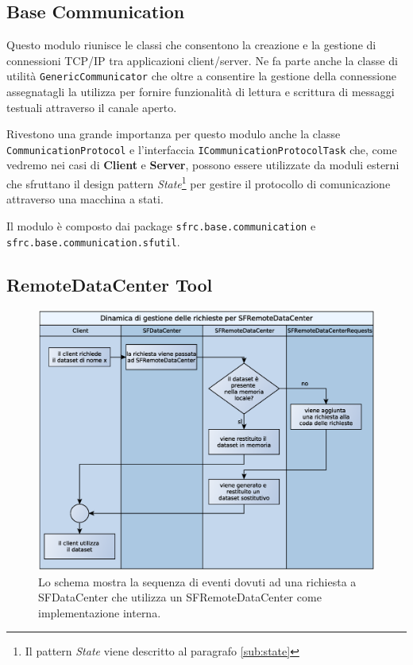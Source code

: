 
\subsection{Base Communication}
\label{sub:basecommodule}
Questo modulo riunisce le classi che consentono la creazione e la gestione di connessioni TCP/IP tra applicazioni client/server. Ne fa parte anche la classe di utilit\`a \texttt{GenericCommunicator} che oltre a consentire la gestione della connessione assegnatagli la utilizza per fornire funzionalit\`a di lettura e scrittura di messaggi testuali attraverso il canale aperto.

Rivestono una grande importanza per questo modulo anche la classe \texttt{CommunicationProtocol} e l'interfaccia \texttt{ICommunicationProtocolTask} che, come vedremo nei casi di \textbf{Client} e \textbf{Server}, possono essere utilizzate da moduli esterni che sfruttano il design pattern \textit{State}\footnote{Il pattern \textit{State} viene descritto al paragrafo \ref{sub:state}} per gestire il protocollo di comunicazione attraverso una macchina a stati.

Il modulo \`e composto dai package \texttt{sfrc.base.communication} e \\\texttt{sfrc.base.communication.sfutil}.

\subsection{RemoteDataCenter Tool}
\label{sub:remotedatacentertoolmodule}

\begin{figure}[t]
\begin{center}
\includegraphics[width=\textwidth]{Immagini/DinamicaSFRemoteDataCenter}
\caption[Sequenza di eventi di una richiesta a SFRemoteDataCenter.]{Lo schema mostra la sequenza di eventi dovuti ad una richiesta a SFDataCenter che utilizza un SFRemoteDataCenter come implementazione interna.\label{f:dinamicasfremotedatacenter}} 
\end{center} 
\end{figure}

